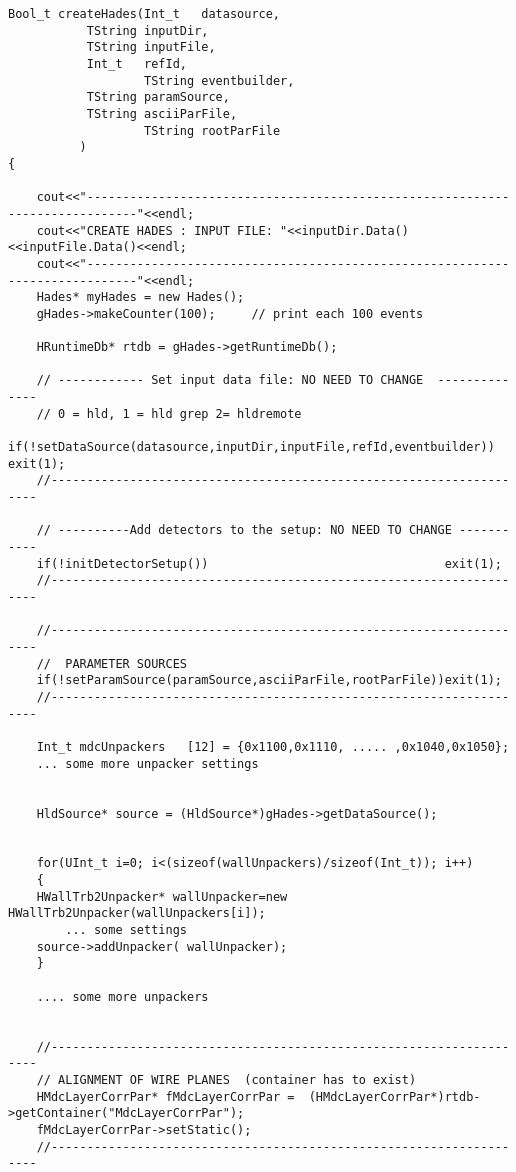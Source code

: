 \begin{lstlisting}
Bool_t createHades(Int_t   datasource,
		   TString inputDir,
		   TString inputFile,
		   Int_t   refId,
                   TString eventbuilder,
		   TString paramSource,
		   TString asciiParFile,
                   TString rootParFile
		  )
{

    cout<<"-----------------------------------------------------------------------------"<<endl;
    cout<<"CREATE HADES : INPUT FILE: "<<inputDir.Data()<<inputFile.Data()<<endl;
    cout<<"-----------------------------------------------------------------------------"<<endl;
    Hades* myHades = new Hades();
    gHades->makeCounter(100);     // print each 100 events
    
    HRuntimeDb* rtdb = gHades->getRuntimeDb();

    // ------------ Set input data file: NO NEED TO CHANGE  --------------
    // 0 = hld, 1 = hld grep 2= hldremote
    if(!setDataSource(datasource,inputDir,inputFile,refId,eventbuilder)) exit(1);
    //--------------------------------------------------------------------
    
    // ----------Add detectors to the setup: NO NEED TO CHANGE -----------
    if(!initDetectorSetup())                                 exit(1);
    //--------------------------------------------------------------------
    
    //--------------------------------------------------------------------
    //  PARAMETER SOURCES
    if(!setParamSource(paramSource,asciiParFile,rootParFile))exit(1);
    //--------------------------------------------------------------------

    Int_t mdcUnpackers   [12] = {0x1100,0x1110, ..... ,0x1040,0x1050};
    ... some more unpacker settings


    HldSource* source = (HldSource*)gHades->getDataSource();


    for(UInt_t i=0; i<(sizeof(wallUnpackers)/sizeof(Int_t)); i++)
    {
	HWallTrb2Unpacker* wallUnpacker=new HWallTrb2Unpacker(wallUnpackers[i]);
        ... some settings
	source->addUnpacker( wallUnpacker);
    }

    .... some more unpackers
    

    //--------------------------------------------------------------------
    // ALIGNMENT OF WIRE PLANES  (container has to exist)
    HMdcLayerCorrPar* fMdcLayerCorrPar =  (HMdcLayerCorrPar*)rtdb->getContainer("MdcLayerCorrPar");
    fMdcLayerCorrPar->setStatic();
    //--------------------------------------------------------------------


\end{lstlisting}
